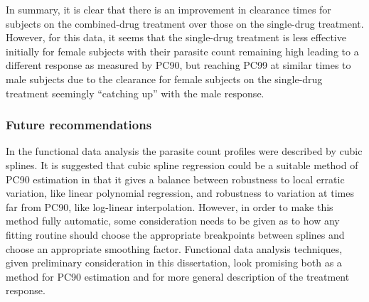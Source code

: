 In summary, it is clear that there is an improvement in clearance times for subjects on the combined-drug treatment over those on the single-drug treatment. However, for this data, it seems that the single-drug treatment is less effective initially for female subjects with their parasite count remaining high leading to a different response as measured by PC90, but reaching PC99 at similar times to male subjects due to the clearance for female subjects on the single-drug treatment seemingly ``catching up'' with the male response.

\subsubsection{Future recommendations}
In the functional data analysis the parasite count profiles were described by cubic splines. It is suggested that cubic spline regression could be a suitable method of PC90 estimation in that it gives a balance between robustness to local erratic variation, like linear polynomial regression, and robustness to variation at times far from PC90, like log-linear interpolation.  However, in order to make this method fully automatic, some consideration needs to be given as to how any fitting routine should choose the appropriate breakpoints between splines and choose an appropriate smoothing factor. Functional data analysis techniques, given preliminary consideration in this dissertation, look promising both as a method for PC90 estimation and for more general description of the treatment response.
